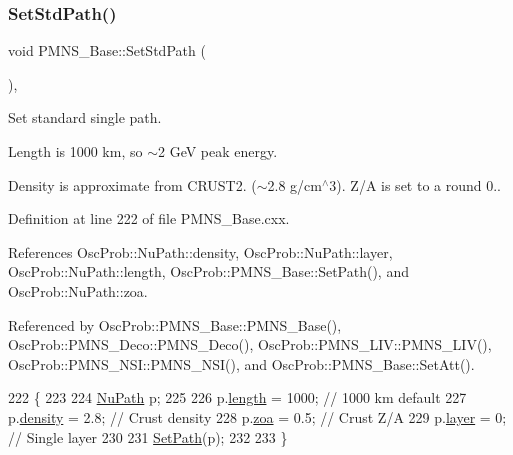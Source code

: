 \subsubsection{\texorpdfstring{Set\+Std\+Path()}{SetStdPath()}}
{\footnotesize\ttfamily void P\+M\+N\+S\+\_\+\+Base\+::\+Set\+Std\+Path (\begin{DoxyParamCaption}{ }\end{DoxyParamCaption})\hspace{0.3cm}{\ttfamily [virtual]}, {\ttfamily [inherited]}}

Set standard single path.

Length is 1000 km, so $\sim$2 GeV peak energy.

Density is approximate from C\+R\+U\+S\+T2. ($\sim$2.8 g/cm$^\wedge$3). Z/A is set to a round 0.. 

Definition at line 222 of file P\+M\+N\+S\+\_\+\+Base.\+cxx.



References Osc\+Prob\+::\+Nu\+Path\+::density, Osc\+Prob\+::\+Nu\+Path\+::layer, Osc\+Prob\+::\+Nu\+Path\+::length, Osc\+Prob\+::\+P\+M\+N\+S\+\_\+\+Base\+::\+Set\+Path(), and Osc\+Prob\+::\+Nu\+Path\+::zoa.



Referenced by Osc\+Prob\+::\+P\+M\+N\+S\+\_\+\+Base\+::\+P\+M\+N\+S\+\_\+\+Base(), Osc\+Prob\+::\+P\+M\+N\+S\+\_\+\+Deco\+::\+P\+M\+N\+S\+\_\+\+Deco(), Osc\+Prob\+::\+P\+M\+N\+S\+\_\+\+L\+I\+V\+::\+P\+M\+N\+S\+\_\+\+L\+I\+V(), Osc\+Prob\+::\+P\+M\+N\+S\+\_\+\+N\+S\+I\+::\+P\+M\+N\+S\+\_\+\+N\+S\+I(), and Osc\+Prob\+::\+P\+M\+N\+S\+\_\+\+Base\+::\+Set\+Att().


\begin{DoxyCode}
222                           \{
223 
224   \hyperlink{structOscProb_1_1NuPath}{NuPath} p;
225 
226   p.\hyperlink{structOscProb_1_1NuPath_af22660894b6e25cf835500381b155557}{length}  = 1000; \textcolor{comment}{// 1000 km default}
227   p.\hyperlink{structOscProb_1_1NuPath_a54ddd451db69bc54434de3cf18a117ca}{density} = 2.8;  \textcolor{comment}{// Crust density}
228   p.\hyperlink{structOscProb_1_1NuPath_af3213f3691ba83c6bc05f4a3490f6b31}{zoa}     = 0.5;  \textcolor{comment}{// Crust Z/A}
229   p.\hyperlink{structOscProb_1_1NuPath_a442b160899e554ad1d800989510d5309}{layer}   = 0;    \textcolor{comment}{// Single layer}
230 
231   \hyperlink{classOscProb_1_1PMNS__Base_ac3b644fd0a56347d304ceca4ae9d8875}{SetPath}(p);
232 
233 \}
\end{DoxyCode}
\mbox{\label{classOscProb_1_1PMNS__Base_aa94c1e1fff0ba731c75f7e633b023a9f}} 
